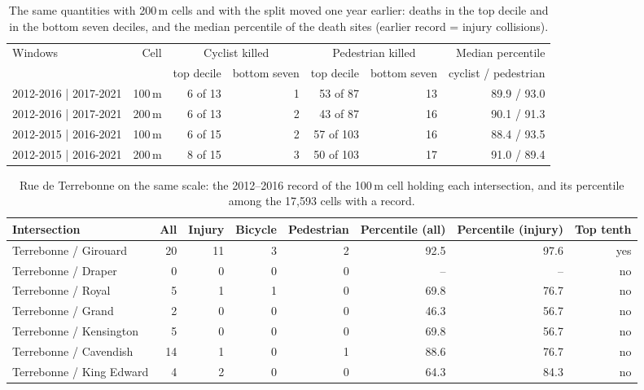 \begin{table}[htbp]\centering\caption{The same quantities with 200\,m cells and with the split moved one year earlier: deaths in the top decile and in the bottom seven deciles, and the median percentile of the death sites (earlier record = injury collisions).}\label{tab:sens}
\footnotesize\setlength{\tabcolsep}{4pt}\begin{tabular}{@{}l r r r r r r@{}}\toprule Windows & Cell & \multicolumn{2}{c}{Cyclist killed} & \multicolumn{2}{c}{Pedestrian killed} & Median percentile\\ & & top decile & bottom seven & top decile & bottom seven & cyclist / pedestrian\\ \midrule
2012-2016 | 2017-2021 & 100\,m & 6 of 13 & 1 & 53 of 87 & 13 & 89.9 / 93.0\\
2012-2016 | 2017-2021 & 200\,m & 6 of 13 & 2 & 43 of 87 & 16 & 90.1 / 91.3\\
2012-2015 | 2016-2021 & 100\,m & 6 of 15 & 2 & 57 of 103 & 16 & 88.4 / 93.5\\
2012-2015 | 2016-2021 & 200\,m & 8 of 15 & 3 & 50 of 103 & 17 & 91.0 / 89.4\\
\bottomrule\end{tabular}\end{table}

\begin{table}[htbp]\centering\caption{Rue de Terrebonne on the same scale: the 2012--2016 record of the 100\,m cell holding each intersection, and its percentile among the 17,593 cells with a record.}\label{tab:terr}
\footnotesize\begin{tabular}{@{}l r r r r r r r@{}}\toprule Intersection & All & Injury & Bicycle & Pedestrian & Percentile (all) & Percentile (injury) & Top tenth\\ \midrule
Terrebonne / Girouard & 20 & 11 & 3 & 2 & 92.5 & 97.6 & yes\\
Terrebonne / Draper & 0 & 0 & 0 & 0 & -- & -- & no\\
Terrebonne / Royal & 5 & 1 & 1 & 0 & 69.8 & 76.7 & no\\
Terrebonne / Grand & 2 & 0 & 0 & 0 & 46.3 & 56.7 & no\\
Terrebonne / Kensington & 5 & 0 & 0 & 0 & 69.8 & 56.7 & no\\
Terrebonne / Cavendish & 14 & 1 & 0 & 1 & 88.6 & 76.7 & no\\
Terrebonne / King Edward & 4 & 2 & 0 & 0 & 64.3 & 84.3 & no\\
\bottomrule\end{tabular}\end{table}
